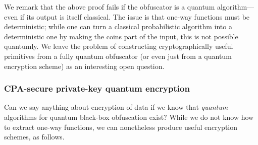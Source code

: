 \documentclass[11pt]{article}
\numberwithin{equation}{section}
\begin{document}
We remark that the above proof fails if the obfuscator is a quantum algorithm---even if its output is itself classical. The issue is that one-way functions must be deterministic; while one can turn a classical probabilistic algorithm into a deterministic one by making the coins part of the input, this is not possible quantumly. We leave the problem of constructing cryptographically useful primitives from a fully quantum obfuscator (or even just from a quantum encryption scheme) as an interesting open question. 

\subsubsection{CPA-secure private-key quantum encryption}

Can we say anything about encryption of data if we know that \emph{quantum} algorithms for quantum black-box obfuscation exist? While we do not know how to extract one-way functions, we can nonetheless produce useful encryption schemes, as follows.
\end{document}
